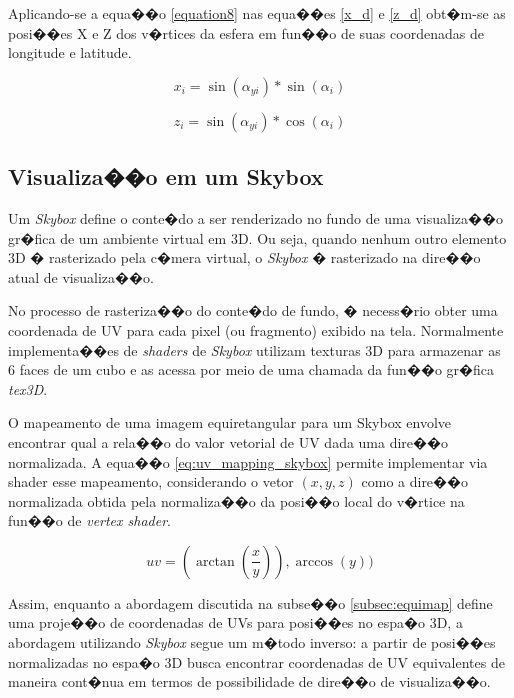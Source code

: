 \documentclass[12pt]{article}
\begin{document}
Aplicando-se a equa��o \ref{equation8} nas equa��es \ref{x_d} e \ref{z_d} obt�m-se as posi��es X e Z dos v�rtices da esfera em fun��o de suas coordenadas de longitude e latitude.

\begin{equation}
x_{i} = \sin(\alpha_{yi}) * \sin(\alpha_i)
\label{equation9}
\end{equation}

\begin{equation}
z_{i} = \sin(\alpha_{yi}) * \cos(\alpha_i)
\label{equation10}
\end{equation}

\subsection{Visualiza��o em um Skybox} \label{subsec:skyboxviz}

Um \textit{Skybox} define o conte�do a ser renderizado no fundo de uma visualiza��o gr�fica de um ambiente virtual em 3D. Ou seja, quando nenhum outro elemento 3D � rasterizado pela c�mera virtual, o \textit{Skybox} � rasterizado na dire��o atual de visualiza��o.

No processo de rasteriza��o do conte�do de fundo, � necess�rio obter uma coordenada de UV para cada pixel (ou fragmento) exibido na tela. Normalmente implementa��es de \textit{shaders} de \textit{Skybox} utilizam texturas 3D para armazenar as 6 faces de um cubo e as acessa por meio de uma chamada da fun��o gr�fica \textit{tex3D}.

O mapeamento de uma imagem equiretangular para um Skybox envolve encontrar qual a rela��o do valor vetorial de UV dada uma dire��o normalizada. A equa��o \ref{eq:uv_mapping_skybox} permite implementar via shader esse mapeamento, considerando o vetor $(x,y,z)$ como a dire��o normalizada obtida pela normaliza��o da posi��o local do v�rtice na fun��o de \textit{vertex shader}.

\begin{equation}
uv = (\arctan(\frac{x}{y})), \arccos(y))
\label{eq:uv_mapping_skybox}
\end{equation}

Assim, enquanto a abordagem discutida na subse��o \ref{subsec:equimap} define uma proje��o de coordenadas de UVs para posi��es no espa�o 3D, a abordagem utilizando \textit{Skybox} segue um m�todo inverso: a partir de posi��es normalizadas no espa�o 3D busca encontrar coordenadas de UV equivalentes de maneira cont�nua em termos de possibilidade de dire��o de visualiza��o.
\end{document}
